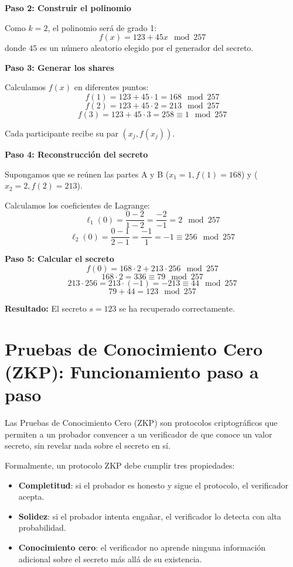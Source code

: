 \documentclass{article}
\begin{document}
\textbf{Paso 2: Construir el polinomio}

Como \( k = 2 \), el polinomio será de grado 1:
\[
f(x) = 123 + 45x \mod 257
\]
donde \( 45 \) es un número aleatorio elegido por el generador del secreto.

\textbf{Paso 3: Generar los shares}

Calculamos \( f(x) \) en diferentes puntos:
\[
f(1) = 123 + 45 \cdot 1 = 168 \mod 257
\]
\[
f(2) = 123 + 45 \cdot 2 = 213 \mod 257
\]
\[
f(3) = 123 + 45 \cdot 3 = 258 \equiv 1 \mod 257
\]

Cada participante recibe su par \( (x_j, f(x_j)) \).

\textbf{Paso 4: Reconstrucción del secreto}

Supongamos que se reúnen las partes A y B (\( x_1 = 1, f(1) = 168 \)) y (\( x_2 = 2, f(2) = 213 \)).

Calculamos los coeficientes de Lagrange:
\[
\ell_1(0) = \frac{0 - 2}{1 - 2} = \frac{-2}{-1} = 2 \mod 257
\]
\[
\ell_2(0) = \frac{0 - 1}{2 - 1} = \frac{-1}{1} = -1 \equiv 256 \mod 257
\]

\textbf{Paso 5: Calcular el secreto}
\[
f(0) = 168 \cdot 2 + 213 \cdot 256 \mod 257
\]
\[
168 \cdot 2 = 336 \equiv 79 \mod 257
\]
\[
213 \cdot 256 = 213 \cdot (-1) = -213 \equiv 44 \mod 257
\]
\[
79 + 44 = 123 \mod 257
\]

\textbf{Resultado:}
El secreto \( s = 123 \) se ha recuperado correctamente.

\section{Pruebas de Conocimiento Cero (ZKP): Funcionamiento paso a paso}

Las Pruebas de Conocimiento Cero (ZKP) son protocolos criptográficos que permiten a un probador convencer a un verificador de que conoce un valor secreto, sin revelar nada sobre el secreto en sí.

Formalmente, un protocolo ZKP debe cumplir tres propiedades:
\begin{itemize}
    \item \textbf{Completitud}: si el probador es honesto y sigue el protocolo, el verificador acepta.
    \item \textbf{Solidez}: si el probador intenta engañar, el verificador lo detecta con alta probabilidad.
    \item \textbf{Conocimiento cero}: el verificador no aprende ninguna información adicional sobre el secreto más allá de su existencia.
\end{itemize}
\end{document}

